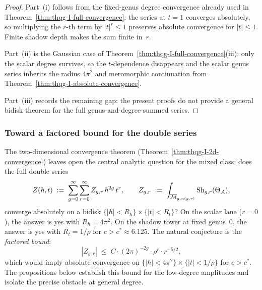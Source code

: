 \begin{proof}
Part~(i) follows from the fixed-genus degree convergence already used in
Theorem~\ref{thm:thqg-I-full-convergence}: the series at $t=1$
converges absolutely, so multiplying the $r$-th term by $|t|^r \leq 1$
preserves absolute convergence for $|t| \leq 1$. Finite shadow depth
makes the sum finite in~$r$.

Part~(ii) is the Gaussian case of
Theorem~\ref{thm:thqg-I-full-convergence}\textup{(iii)}: only the scalar
degree survives, so the $t$-dependence disappears and the scalar genus
series inherits the radius $4\pi^2$ and meromorphic continuation from
Theorem~\ref{thm:thqg-I-absolute-convergence}.

Part~(iii) records the remaining gap: the present proofs do not provide
a general bidisk theorem for the full genus-and-degree-summed series.
\end{proof}

\subsubsection{Toward a factored bound for the double series}

The two-dimensional convergence theorem
(Theorem~\ref{thm:thqg-I-2d-convergence}) leaves open the central
analytic question for the mixed class: does the full double series
\begin{equation}\label{eq:double-series-def}
Z(\hbar,t) \;:=\; \sum_{g=0}^\infty \sum_{r=0}^\infty
Z_{g,r}\,\hbar^{2g}\,t^r,
\qquad
Z_{g,r} \;:=\; \int_{\overline{\mathcal{M}}_{g,n(g,r)}}
\operatorname{Sh}_{g,r}(\Theta_{\mathcal{A}}),
\end{equation}
converge absolutely on a bidisk
$\{|\hbar| < R_\hbar\} \times \{|t| < R_t\}$? On the scalar lane
($r = 0$), the answer is yes with $R_\hbar = 4\pi^2$. On the shadow
tower at fixed genus~$0$, the answer is yes with $R_t = 1/\rho$
for $c > c^* \approx 6.125$. The natural conjecture is the
\emph{factored bound}:
\begin{equation}\label{eq:factored-bound-conj}
|Z_{g,r}| \;\leq\; C \cdot (2\pi)^{-2g} \cdot \rho^r \cdot r^{-5/2},
\end{equation}
which would imply absolute convergence on
$\{|\hbar| < 4\pi^2\} \times \{|t| < 1/\rho\}$ for $c > c^*$.
The propositions below establish this bound for the low-degree
amplitudes and isolate the precise obstacle at general degree.

